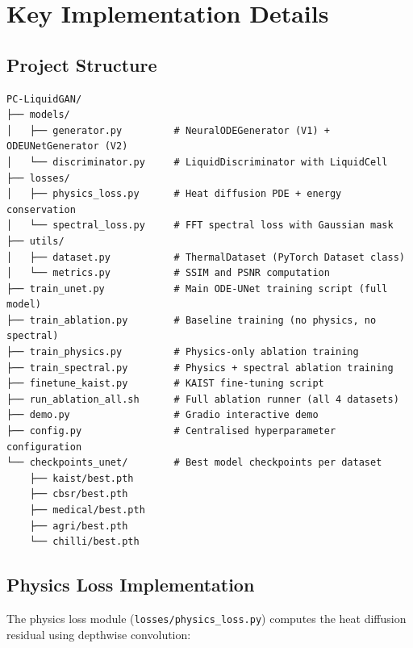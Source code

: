 \chapter{Key Implementation Details}
\label{AppendixC}

\section{Project Structure}

\begin{verbatim}
PC-LiquidGAN/
├── models/
│   ├── generator.py         # NeuralODEGenerator (V1) + ODEUNetGenerator (V2)
│   └── discriminator.py     # LiquidDiscriminator with LiquidCell
├── losses/
│   ├── physics_loss.py      # Heat diffusion PDE + energy conservation
│   └── spectral_loss.py     # FFT spectral loss with Gaussian mask
├── utils/
│   ├── dataset.py           # ThermalDataset (PyTorch Dataset class)
│   └── metrics.py           # SSIM and PSNR computation
├── train_unet.py            # Main ODE-UNet training script (full model)
├── train_ablation.py        # Baseline training (no physics, no spectral)
├── train_physics.py         # Physics-only ablation training
├── train_spectral.py        # Physics + spectral ablation training
├── finetune_kaist.py        # KAIST fine-tuning script
├── run_ablation_all.sh      # Full ablation runner (all 4 datasets)
├── demo.py                  # Gradio interactive demo
├── config.py                # Centralised hyperparameter configuration
└── checkpoints_unet/        # Best model checkpoints per dataset
    ├── kaist/best.pth
    ├── cbsr/best.pth
    ├── medical/best.pth
    ├── agri/best.pth
    └── chilli/best.pth
\end{verbatim}

\section{Physics Loss Implementation}

The physics loss module (\texttt{losses/physics\_loss.py}) computes the heat diffusion residual using depthwise convolution:

